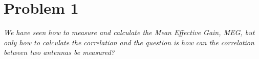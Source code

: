 \section{Problem 1}
\textit{We have seen how to measure and calculate the Mean Effective Gain, MEG, but only how to calculate the correlation and the question is how can the correlation between two antennas be measured?}
